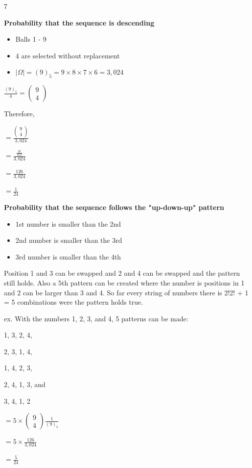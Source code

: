 \documentclass[12 pt]{article}
\begin{document}
    \begin{exercise}{7}
    \hfill

    \textbf{Probability that the sequence is descending}
    \begin{itemize}
        \item Balls 1 - 9
        \item 4 are selected without replacement
        \item $|\Omega| = (9)_5 = 9 \times 8 \times 7 \times 6 = 3,024$
    \end{itemize}

    $\frac{(9)_5}{4} = \begin{pmatrix}
        9 \\
        4
    \end{pmatrix}$

    Therefore,

    $ = \frac{\begin{pmatrix}
        9 \\
        4
    \end{pmatrix}}{3,024}$

     $= \frac{\frac{9!}{4!5!}}{3,024}$

    $= \frac{126}{3,024}$

    $= \frac{1}{24}$

    \textbf{Probability that the sequence follows the "up-down-up" pattern}
    \begin{itemize}
        \item 1st number is smaller than the 2nd
        \item 2nd number is smaller than the 3rd
        \item 3rd number is smaller than the 4th
    \end{itemize}

    Position 1 and 3 can be swapped and 2 and 4 can be swapped and the pattern still holds. Also a 5th pattern can be created where the number is positions in 1 and 2 can be larger than 3 and 4. So far every string of numbers there is 2!2! + 1 = 5 combinations were the pattern holds true.

    ex. With the numbers 1, 2, 3, and 4, 5 patterns can be made: 
    
    {1, 3, 2, 4},
    
    {2, 3, 1, 4}, 
    
    {1, 4, 2, 3}, 
    
    {2, 4, 1, 3}, and 
    
    {3, 4, 1, 2}

    $= 5 \times \begin{pmatrix}
        9 \\
        4
    \end{pmatrix} \frac{1}{(9)_5}$

    $= 5 \times\frac{126}{3,024}$

    $= \frac{5}{24}$
    \end{exercise}
\end{document}
